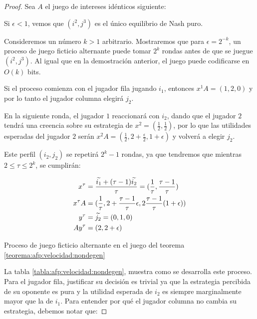 \begin{proof}
    Sea $A$ el juego de intereses idénticos siguiente:

    

    Si $\epsilon < 1$, vemos que $(i^2, j^3)$ es el único equilibrio de Nash puro.

    Consideremos un número $k > 1$ arbitrario. Mostraremos que para $\epsilon = 2^{-k}$, un proceso de juego ficticio alternante puede tomar $2^k$ rondas antes de que se juegue $(i^2, j^3)$. Al igual que en la demostración anterior, el juego puede codificarse en $O(k)$ bits.

    Si el proceso comienza con el jugador fila jugando $i_1$, entonces $x^1A = (1, 2, 0)$ y por lo tanto el jugador columna elegirá $j_2$.

    En la siguiente ronda, el jugador $1$ reaccionará con $i_2$, dando que el jugador $2$ tendrá una creencia sobre su estrategia de $x^2 = (\frac{1}{2},\frac{1}{2})$, por lo que las utilidades esperadas del jugador $2$ serán $x^2A = (\frac{1}{2}, 2 + \frac{\epsilon}{2}, 1 + \epsilon)$ y volverá a elegir $j_2$.

    Este perfil $(i_2, j_2)$ se repetirá $2^k - 1$ rondas, ya que tendremos que mientras $2 \le \tau \le 2^k$, se cumplirán:

    \begin{align*}
        x^\tau     &= \frac{\widetilde{i_1} + (\tau - 1) \widetilde{i_2}}{\tau} = (\frac{1}{\tau}, \frac{\tau - 1}{\tau}) \\
        x^{\tau}A  &= (\frac{1}{\tau}, 2+\frac{\tau - 1}{\tau}\epsilon, 2\frac{\tau - 1}{\tau}(1+\epsilon)) \\
        y^\tau     &= \widetilde{j_2} = (0, 1, 0) \\
        Ay^\tau    &= (2, 2 + \epsilon) \\
    \end{align*}

    \begin{table}
        
        \caption{Proceso de juego ficticio alternante en el juego del teorema \ref{teorema:afp:velocidad:nondegen}}
        \label{tabla:afp:velocidad:nondegen}
    \end{table}

    La tabla \ref{tabla:afp:velocidad:nondegen}, muestra como se desarrolla este proceso. Para el jugador fila, justificar su decisión es trivial ya que la estrategia percibida de su oponente es pura y la utilidad esperada de  $i_2$ es siempre marginalmente mayor que la de $i_1$. Para entender por qué el jugador columna no cambia su estrategia, debemos notar que:


\end{proof}
